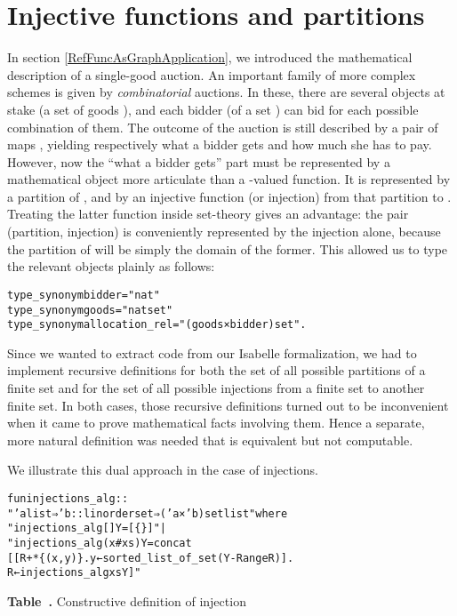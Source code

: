 \documentclass[
]{llncs}
\newenvironment{mytable}{
\vspace{0.2ex}
\begin{center}\begin{minipage}
{0.9\textwidth}\renewcommand{\baselinestretch}{0.75}\begin{small}}
{\end{small}\end{minipage}\end{center}
\vspace{0.1ex}
}
\newcommand{\mycaption}[1]{\refstepcounter{table}\centerline{\textbf{Table~\arabic{table}.} #1}}
\newcommand{\I}{Isabelle}
\begin{document}
\section{Injective functions and partitions}
\label{RefDualDefs}
In section \ref{RefFuncAsGraphApplication}, we introduced the mathematical description of a single-good auction.
An important family of more complex schemes is given by \emph{combinatorial} auctions.
In these, there are several objects at stake (a set of goods ), and each bidder (of a set ) can bid for each possible combination of them.
The outcome of the auction is still described by a pair of maps , yielding respectively what a bidder gets and how much she has to pay.
However, now the ``what a bidder gets{}'' part must be represented by a mathematical object more articulate than a -valued function.
It is represented by a partition of , and by an injective function (or injection) from that partition to .
Treating the latter function inside set-theory gives an advantage: the pair (partition, injection) is conveniently represented by the injection alone, because the partition of  will be simply the domain of the former.
This allowed us to type the relevant objects plainly as follows:
\begin{mytable}
\begin{alltt}
type_synonym bidder = "nat"
type_synonym goods = "nat set"
type_synonym allocation_rel = "(goods × bidder) set".
\end{alltt}
\end{mytable}

Since we wanted to extract code from our \I{} formalization, we had to implement recursive definitions for both the set of all possible partitions of a finite set and for the set of all possible injections from a finite set to another finite set.
In both cases, those recursive definitions turned out to be inconvenient when it came to prove mathematical facts involving them. Hence a separate, more natural definition was needed that is equivalent but not computable.

We illustrate this dual approach in the case of injections.
\begin{mytable}
\begin{alltt}
fun injections_alg :: 
"'a list ⇒ 'b::linorder set ⇒ ('a × 'b) set list" where 
"injections_alg [] Y = [\{\}]" |
"injections_alg (x # xs) Y = concat 
[[R+*\{(x,y)\}. y←sorted_list_of_set (Y-Range R)]. 
                          R ← injections_alg xs Y]"
\end{alltt}
\mycaption{Constructive definition of injection}\label{table:injective_alg}
\end{mytable}
\end{document}
